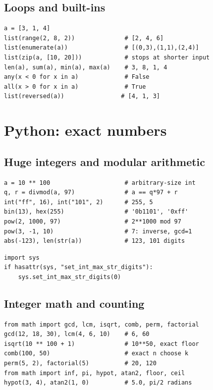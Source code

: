 \subsection{Loops and built-ins}
\begin{lstlisting}[label=py:builtins]
a = [3, 1, 4]
list(range(2, 8, 2))              # [2, 4, 6]
list(enumerate(a))                # [(0,3),(1,1),(2,4)]
list(zip(a, [10, 20]))            # stops at shorter input
len(a), sum(a), min(a), max(a)    # 3, 8, 1, 4
any(x < 0 for x in a)             # False
all(x > 0 for x in a)             # True
list(reversed(a))                # [4, 1, 3]
\end{lstlisting}

\section{Python: exact numbers}

\subsection{Huge integers and modular arithmetic}
\begin{lstlisting}[label=py:integers]
a = 10 ** 100                     # arbitrary-size int
q, r = divmod(a, 97)              # a == q*97 + r
int("ff", 16), int("101", 2)      # 255, 5
bin(13), hex(255)                 # '0b1101', '0xff'
pow(2, 1000, 97)                  # 2**1000 mod 97
pow(3, -1, 10)                    # 7: inverse, gcd=1
abs(-123), len(str(a))            # 123, 101 digits
\end{lstlisting}

\begin{lstlisting}
import sys
if hasattr(sys, "set_int_max_str_digits"):
    sys.set_int_max_str_digits(0)
\end{lstlisting}

\subsection{Integer math and counting}
\begin{lstlisting}[label=py:math]
from math import gcd, lcm, isqrt, comb, perm, factorial
gcd(12, 18, 30), lcm(4, 6, 10)    # 6, 60
isqrt(10 ** 100 + 1)              # 10**50, exact floor
comb(100, 50)                     # exact n choose k
perm(5, 2), factorial(5)          # 20, 120
from math import inf, pi, hypot, atan2, floor, ceil
hypot(3, 4), atan2(1, 0)          # 5.0, pi/2 radians
\end{lstlisting}

